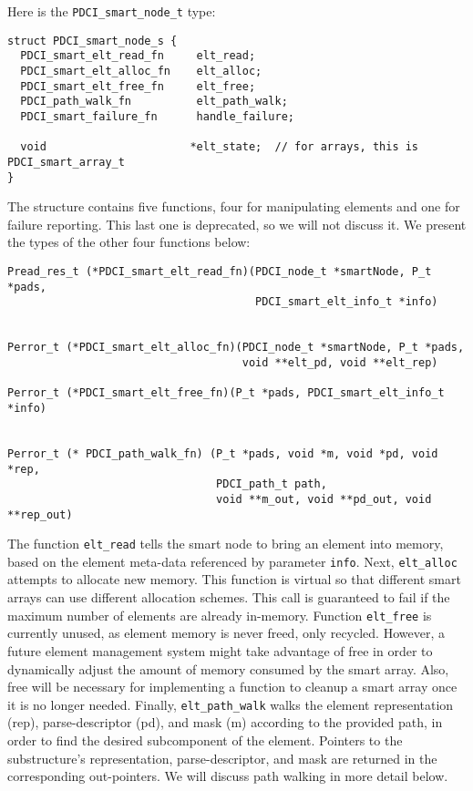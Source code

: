 \documentclass{article}
\begin{document}
Here is the \verb|PDCI_smart_node_t| type:
\begin{verbatim}
struct PDCI_smart_node_s {
  PDCI_smart_elt_read_fn     elt_read;
  PDCI_smart_elt_alloc_fn    elt_alloc;
  PDCI_smart_elt_free_fn     elt_free;
  PDCI_path_walk_fn          elt_path_walk;
  PDCI_smart_failure_fn      handle_failure;

  void                      *elt_state;  // for arrays, this is PDCI_smart_array_t 
}
\end{verbatim}

The structure contains five functions, four for manipulating elements
and one for failure reporting. This last one is deprecated, so we
will not discuss it. We present the types of the other four functions
below:

\begin{verbatim}
Pread_res_t (*PDCI_smart_elt_read_fn)(PDCI_node_t *smartNode, P_t *pads, 
                                      PDCI_smart_elt_info_t *info)


Perror_t (*PDCI_smart_elt_alloc_fn)(PDCI_node_t *smartNode, P_t *pads,
                                    void **elt_pd, void **elt_rep)

Perror_t (*PDCI_smart_elt_free_fn)(P_t *pads, PDCI_smart_elt_info_t *info)


Perror_t (* PDCI_path_walk_fn) (P_t *pads, void *m, void *pd, void *rep, 
                                PDCI_path_t path,
                                void **m_out, void **pd_out, void **rep_out)
\end{verbatim}


The function \verb|elt_read| tells the smart node to bring an element
into memory, based on the element meta-data referenced by parameter
\verb|info|. Next, \verb|elt_alloc| attempts to allocate new memory.
This function is virtual so that different smart arrays can use
different allocation schemes. This call is guaranteed to fail if the
maximum number of elements are already in-memory. Function
\verb|elt_free| is currently unused, as element memory is never freed,
only recycled. However, a future element management system might take
advantage of free in order to dynamically adjust the amount of memory
consumed by the smart array. Also, free will be necessary for
implementing a function to cleanup a smart array once it is no longer
needed. Finally, \verb|elt_path_walk| walks the element representation
(rep), parse-descriptor (pd), and mask (m) according to the provided
path, in order to find the desired subcomponent of the element.
Pointers to the substructure's representation, parse-descriptor, and
mask are returned in the corresponding out-pointers. We will discuss
path walking in more detail below.
\end{document}
